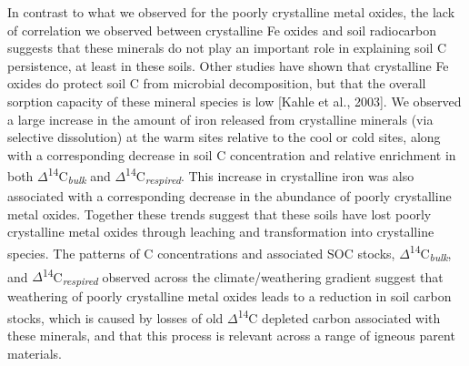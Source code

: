 \documentclass[english,man,floatsintext]{apa6}
\begin{document}
In contrast to what we observed for the poorly crystalline metal oxides, the lack of correlation we observed between crystalline Fe oxides and soil radiocarbon suggests that these minerals do not play an important role in explaining soil C persistence, at least in these soils. Other studies have shown that crystalline Fe oxides do protect soil C from microbial decomposition, but that the overall sorption capacity of these mineral species is low {[}Kahle et al., 2003{]}. We observed a large increase in the amount of iron released from crystalline minerals (via selective dissolution) at the warm sites relative to the cool or cold sites, along with a corresponding decrease in soil C concentration and relative enrichment in both \(\Delta\)\textsuperscript{14}C\textsubscript{\emph{bulk}} and \(\Delta\)\textsuperscript{14}C\textsubscript{\emph{respired}}. This increase in crystalline iron was also associated with a corresponding decrease in the abundance of poorly crystalline metal oxides. Together these trends suggest that these soils have lost poorly crystalline metal oxides through leaching and transformation into crystalline species. The patterns of C concentrations and associated SOC stocks, \(\Delta\)\textsuperscript{14}C\textsubscript{\emph{bulk}}, and \(\Delta\)\textsuperscript{14}C\textsubscript{\emph{respired}} observed across the climate/weathering gradient suggest that weathering of poorly crystalline metal oxides leads to a reduction in soil carbon stocks, which is caused by losses of old \(\Delta\)\textsuperscript{14}C depleted carbon associated with these minerals, and that this process is relevant across a range of igneous parent materials.
\end{document}
